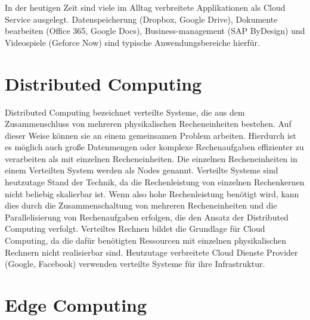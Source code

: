 In der heutigen Zeit sind viele im Alltag verbreitete Applikationen als Cloud Service ausgelegt. Datenspeicherung (Dropbox, Google Drive), Dokumente bearbeiten (Office 365, Google Docs), Business-management (SAP ByDesign) und Videospiele (Geforce Now) sind typische Anwendungsbereiche hierfür. 

\section{Distributed Computing}

Distributed Computing bezeichnet verteilte Systeme, die aus dem Zusammenschluss von mehreren physikalischen Recheneinheiten bestehen. Auf dieser Weise können sie an einem gemeinsamen Problem arbeiten. Hierdurch ist es möglich auch große Datenmengen oder komplexe Rechenaufgaben effizienter zu verarbeiten als mit einzelnen Recheneinheiten. \cite{AWS2023} Die einzelnen Recheneinheiten in einem Verteilten System werden als Nodes genannt. \cite{ord1994scale} Verteilte Systeme sind heutzutage Stand der Technik, da die Rechenleistung von einzelnen Rechenkernen nicht beliebig skalierbar ist. Wenn also hohe Rechenleistung benötigt wird, kann dies  durch die Zusammenschaltung von mehreren Recheneinheiten und die Parallelisierung von Rechenaufgaben erfolgen, die den Ansatz der Distributed Computing verfolgt. Verteiltes Rechnen bildet die Grundlage für Cloud Computing, da die dafür benötigten Ressourcen mit einzelnen physikalischen Rechnern nicht realisierbar sind. Heutzutage verbreitete Cloud Dienste Provider (Google, Facebook) verwenden verteilte Systeme für ihre Infrastruktur. \cite{arpaci2018operating} 

\section{Edge Computing}

